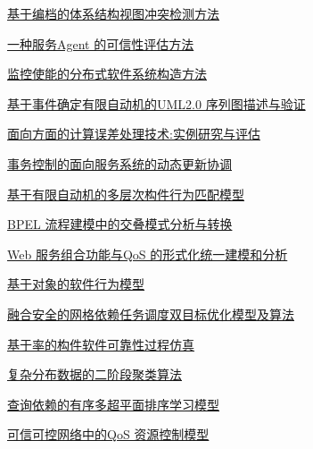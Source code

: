 \documentclass[a4paper]{article}
\begin{document}
\href{http://www.jos.org.cn/ch/reader/download_pdf.aspx?file_no=3959&year_id=2011&quarter_id=11&falg=1}{基于编档的体系结构视图冲突检测方法}

\href{http://www.jos.org.cn/ch/reader/download_pdf.aspx?file_no=3921&year_id=2011&quarter_id=11&falg=1}{一种服务Agent 的可信性评估方法}

\href{http://www.jos.org.cn/ch/reader/download_pdf.aspx?file_no=4081&year_id=2011&quarter_id=11&falg=1}{监控使能的分布式软件系统构造方法}

\href{http://www.jos.org.cn/ch/reader/download_pdf.aspx?file_no=4005&year_id=2011&quarter_id=11&falg=1}{基于事件确定有限自动机的UML2.0 序列图描述与验证}

\href{http://www.jos.org.cn/ch/reader/download_pdf.aspx?file_no=3892&year_id=2011&quarter_id=11&falg=1}{面向方面的计算误差处理技术:实例研究与评估}

\href{http://www.jos.org.cn/ch/reader/download_pdf.aspx?file_no=3917&year_id=2011&quarter_id=11&falg=1}{事务控制的面向服务系统的动态更新协调}

\href{http://www.jos.org.cn/ch/reader/download_pdf.aspx?file_no=3926&year_id=2011&quarter_id=11&falg=1}{基于有限自动机的多层次构件行为匹配模型}

\href{http://www.jos.org.cn/ch/reader/download_pdf.aspx?file_no=4075&year_id=2011&quarter_id=11&falg=1}{BPEL 流程建模中的交叠模式分析与转换}

\href{http://www.jos.org.cn/ch/reader/download_pdf.aspx?file_no=3902&year_id=2011&quarter_id=11&falg=1}{Web 服务组合功能与QoS 的形式化统一建模和分析}

\href{http://www.jos.org.cn/ch/reader/download_pdf.aspx?file_no=3923&year_id=2011&quarter_id=11&falg=1}{基于对象的软件行为模型}

\href{http://www.jos.org.cn/ch/reader/download_pdf.aspx?file_no=3900&year_id=2011&quarter_id=11&falg=1}{融合安全的网格依赖任务调度双目标优化模型及算法}

\href{http://www.jos.org.cn/ch/reader/download_pdf.aspx?file_no=3930&year_id=2011&quarter_id=11&falg=1}{基于率的构件软件可靠性过程仿真}

\href{http://www.jos.org.cn/ch/reader/download_pdf.aspx?file_no=3903&year_id=2011&quarter_id=11&falg=1}{复杂分布数据的二阶段聚类算法}

\href{http://www.jos.org.cn/ch/reader/download_pdf.aspx?file_no=3908&year_id=2011&quarter_id=11&falg=1}{查询依赖的有序多超平面排序学习模型}

\href{http://www.jos.org.cn/ch/reader/download_pdf.aspx?file_no=3914&year_id=2011&quarter_id=11&falg=1}{可信可控网络中的QoS 资源控制模型}
\end{document}
